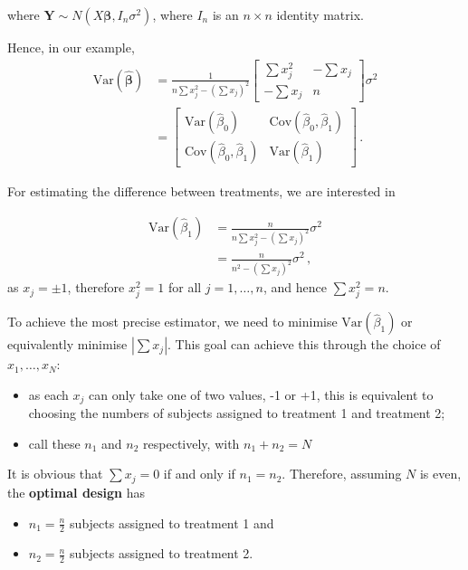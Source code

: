 \documentclass[
]{book}
\providecommand{\tightlist}{%
  \setlength{\itemsep}{0pt}\setlength{\parskip}{0pt}}
\theoremstyle{definition}
\theoremstyle{definition}
\theoremstyle{definition}
\theoremstyle{definition}
\theoremstyle{remark}
\begin{document}
where \(\boldsymbol{Y}\sim N(X\boldsymbol{\beta},I_n\sigma^{2})\), where \(I_n\) is an \(n\times n\) identity matrix.

Hence, in our example,
\begin{align*}
\textrm{Var}(\hat{\boldsymbol{\beta}}) & = \frac{1}{n\sum x_j^{2}-(\sum x_j)^{2}}\left[\begin{array}{cc}
\sum x_j^{2}&-\sum x_j\\
-\sum x_j&n\end{array}\right]\sigma^{2}\\
& = \left[\begin{array}{cc}
\textrm{Var}(\hat\beta_{0})&\textrm{Cov}(\hat\beta_{0},\hat\beta_{1})\\
\textrm{Cov}(\hat\beta_{0},\hat\beta_{1})&\textrm{Var}(\hat\beta_{1})\end{array}\right]\,.
\end{align*}

For estimating the difference between treatments, we are interested in

\begin{align*}
\textrm{Var}(\hat{\beta}_{1})& = \frac{n}{n\sum x_j^{2}-(\sum x_j)^{2}}\sigma^{2}\\
 & = \frac{n}{n^2 - (\sum x_j)^2}\sigma^{2}\,,
\end{align*}
as \(x_j=\pm 1\), therefore \(x_j^2=1\) for all \(j=1,\ldots,n\), and hence \(\sum x_j^2=n\).

To achieve the most precise estimator, we need to minimise \(\textrm{Var}(\hat{\beta}_{1})\) or equivalently minimise \(|\sum x_j|\). This goal can achieve this through the choice of \(x_{1},\dots,x_{N}\):

\begin{itemize}
\tightlist
\item
  as each \(x_j\) can only take one of two values, -1 or +1, this is equivalent to choosing the numbers of subjects assigned to treatment 1 and treatment 2;
\item
  call these \(n_{1}\) and \(n_{2}\) respectively, with \(n_{1}+n_{2}=N\)
\end{itemize}

It is obvious that \(\sum x_j = 0\) if and only if \(n_1=n_2\). Therefore, assuming \(N\) is even, the \textbf{optimal design} has

\begin{itemize}
\tightlist
\item
  \(n_{1}=\frac{n}{2}\) subjects assigned to treatment 1 and
\item
  \(n_{2}=\frac{n}{2}\) subjects assigned to treatment 2.
\end{itemize}
\end{document}
